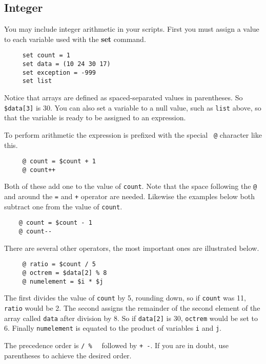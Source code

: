 \documentclass[twoside,11pt]{article}
\newcommand{\xlabel}[1]{}
\begin{document}
\subsection{\xlabel{sc4_se_integer}Integer\label{sc4_se_integer}}

You may include integer arithmetic in your scripts.  First you must
assign a value to each variable used with the {\bf set} command.

\small
\begin{verbatim}
     set count = 1
     set data = (10 24 30 17)
     set exception = -999
     set list
\end{verbatim}
\normalsize

Notice that arrays are defined as spaced-separated values in
parentheses.  So {\tt \$data[3]} is 30.  You can also set a variable
to a null value, such as {\tt list} above, so that the variable is
ready to be assigned to an expression.

To perform arithmetic the expression is prefixed with the special {\tt
@} character like this.

\small
\begin{verbatim}
     @ count = $count + 1
     @ count++
\end{verbatim}
\normalsize
Both of these add one to the value of {\tt count}.  Note that the space
following the {\tt @} and around the {\tt =} and {\tt +} operator are
needed.  Likewise the examples below both subtract one from the value of
{\tt count}.

\small
\begin{verbatim}
    @ count = $count - 1
    @ count--
\end{verbatim}
\normalsize

There are several other operators, the most important ones are
illustrated below.

\small
\begin{verbatim}
     @ ratio = $count / 5
     @ octrem = $data[2] % 8
     @ numelement = $i * $j
\end{verbatim}
\normalsize
The first divides the value of {\tt count} by 5, rounding down, so
if {\tt count} was 11, {\tt ratio} would be 2.  The second assigns
the remainder of the second element of the array called {\tt data}
after division by 8.  So if {\tt data[2]} is 30, {\tt octrem} would be
set to 6.  Finally {\tt numelement} is equated to the product of
variables {\tt i} and {\tt j}.

The precedence order is {\tt * / \%}~~ followed by {\tt + -}.  If
you are in doubt, use parentheses to achieve the desired order.
\end{document}
